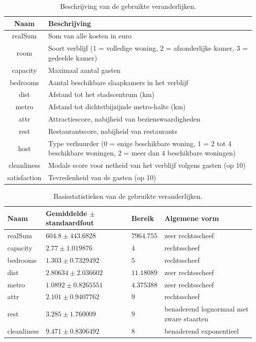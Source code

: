 \documentclass[a4paper]{kulakarticle}
\begin{document}
\begin{table}[h]
	\centering
	\begin{tabular}{c|p{10cm}}
		\raggedright
		Naam & Beschrijving\\
		\hline
		realSum & Som van alle kosten in euro\\ 
		room & Soort verblijf (1 = volledige woning, 2 = afzonderlijke kamer, 
		3 = gedeelde kamer) \\ 
		capacity & Maximaal aantal gasten \\
		bedrooms & Aantal beschikbare slaapkamers in het verblijf \\
		dist & Afstand tot het stadscentrum (km) \\
		metro & Afstand tot dichtstbijzijnde metro-halte (km)\\
		attr & Attractiescore, nabijheid van bezienswaardigheden \\
		rest & Restaurantscore, nabijheid van restaurants \\ 
		host & Type verhuurder (0 = enige beschikbare woning, 1 = 2 tot 4 beschikbare woningen,
		2 = meer dan 4 beschikbare woningen) \\ 
		cleanliness & Modale score voor netheid van het verblijf volgens gasten (op 10) \\
		satisfaction & Tevredenheid van de gasten (op 10)\\
		
	\end{tabular}
	\caption{Beschrijving van de gebruikte veranderlijken.}
	\label{beschrijving}
\end{table}
\begin{table}[h]
	\centering
	\begin{tabular}{| l| l| l|  p{5cm} |}
		\hline
		Naam & Gemiddelde $\pm$ standaardfout  & Bereik & Algemene vorm\\  [1ex]
		\hline\hline
		realSum & $604.8\pm 443.6828 $ & $7964.755$  &  zeer rechtsscheef\\    [0.5ex]
		\hline
		capacity & $2.77\pm 1.019876$ & $4$  & rechtsscheef \\[0.5ex]
		\hline
		bedrooms & $1.303\pm 0.7329492$ & $5$ & rechtsscheef \\[0.5ex]
		\hline
		dist & $2.80634\pm 2.036602$  & $11.18089$ & zeer rechtsscheef \\  [0.5ex]
		\hline
		metro & $1.0892\pm 0.8265551$ & $4.375388$ & zeer rechtsscheef \\ [0.5ex]
		\hline
		attr & $2.101\pm 0.9407762$ & $9$  & rechtsscheef \\  [0.5ex]
		\hline
		rest & $3.285\pm 1.760009$ & $9$ & benaderend lognormaal met zware staarten \\ [0.5ex]
		\hline
		cleanliness & $9.471\pm 0.8306492$ & $8$ & benaderend exponentieel  \\ [0.5ex]
		\hline
	\end{tabular}
	\caption{Basisstatistieken van de gebruikte veranderlijken.}
	\label{uitreksel}
\end{table}
	
\end{document}
